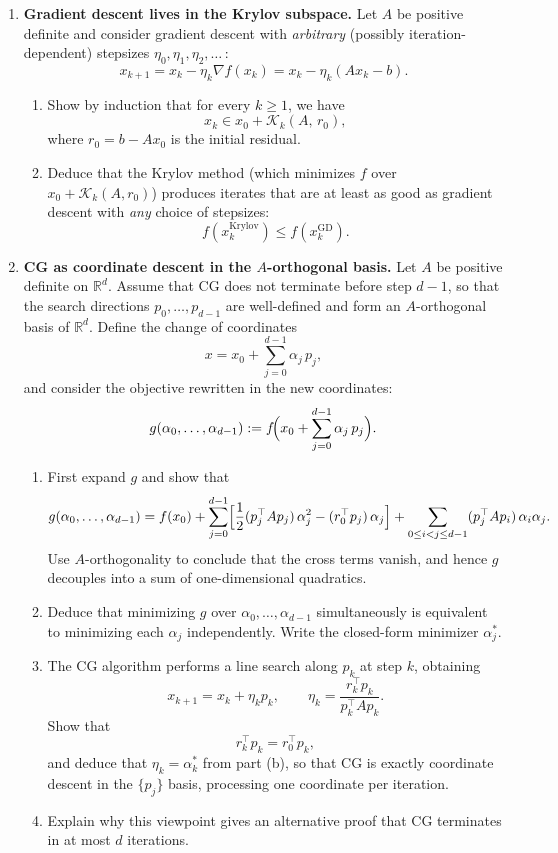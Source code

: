 \documentclass[11pt]{article}
\newcommand{\R}{\mathbb{R}}
\newcommand{\K}{\mathcal{K}}
\begin{document}
\begin{enumerate}[label=\textbf{T\arabic*.}, leftmargin=0pt, itemindent=2.5em]

\item \textbf{Gradient descent lives in the Krylov subspace.}
Let $A$ be positive definite and consider gradient descent with \emph{arbitrary} (possibly iteration-dependent) stepsizes $\eta_0,\eta_1,\eta_2,\dots$\,:
\[
x_{k+1}=x_k-\eta_k\nabla f(x_k)=x_k-\eta_k(Ax_k-b).
\]
\begin{enumerate}[label=(\alph*)]
\item Show by induction that for every $k\ge 1$, we have
\[
x_k \in x_0+\K_k(A,\,r_0),
\]
where $r_0=b-Ax_0$ is the initial residual.
\item Deduce that the Krylov method (which minimizes $f$ over $x_0+\K_k(A,r_0)$) produces iterates that are at least as good as gradient descent with \emph{any} choice of stepsizes:
\[
f(x_k^{\mathrm{Krylov}})\le f(x_k^{\mathrm{GD}}).
\]
\end{enumerate}

\item \textbf{CG as coordinate descent in the $A$-orthogonal basis.}
Let $A$ be positive definite on $\R^d$. Assume that CG does not terminate before step $d-1$, so that the search directions $p_0,\dots,p_{d-1}$ are well-defined and form an $A$-orthogonal basis of $\R^d$. Define the change of coordinates
\[
x = x_0 + \sum_{j=0}^{d-1} \alpha_j\, p_j,
\]
and consider the objective rewritten in the new coordinates:
\[
g(\alpha_0,\dots,\alpha_{d-1}) := f\!\Bigl(x_0+\sum_{j=0}^{d-1}\alpha_j\,p_j\Bigr).
\]
\begin{enumerate}[label=(\alph*)]
\item First expand $g$ and show that
\[
g(\alpha_0,\dots,\alpha_{d-1})
= f(x_0) + \sum_{j=0}^{d-1}\Bigl[\frac{1}{2}(p_j^\top A p_j)\,\alpha_j^2 - (r_0^\top p_j)\,\alpha_j\Bigr]
+\sum_{0\le i<j\le d-1}(p_j^\top A p_i)\,\alpha_i\alpha_j.
\]
Use $A$-orthogonality to conclude that the cross terms vanish, and hence $g$ decouples into a sum of one-dimensional quadratics.
\item Deduce that minimizing $g$ over $\alpha_0,\dots,\alpha_{d-1}$ simultaneously is equivalent to minimizing each $\alpha_j$ independently. Write the closed-form minimizer $\alpha_j^\ast$.
\item The CG algorithm performs a line search along $p_k$ at step $k$, obtaining
\[
x_{k+1}=x_k+\eta_k p_k,\qquad \eta_k=\frac{r_k^\top p_k}{p_k^\top A p_k}.
\]
Show that
\[
r_k^\top p_k=r_0^\top p_k,
\]
and deduce that $\eta_k = \alpha_k^\ast$ from part (b), so that CG is exactly coordinate descent in the $\{p_j\}$ basis, processing one coordinate per iteration.
\item Explain why this viewpoint gives an alternative proof that CG terminates in at most $d$ iterations.
\end{enumerate}


\end{enumerate}
\end{document}
